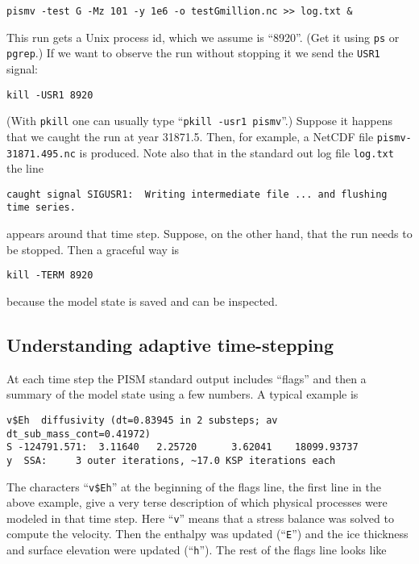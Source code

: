 \begin{verbatim}
pismv -test G -Mz 101 -y 1e6 -o testGmillion.nc >> log.txt &
\end{verbatim}

\noindent This run gets a Unix process id, which we assume is ``8920''.  (Get it using \texttt{ps} or \texttt{pgrep}.)  If we want to observe the run without stopping it we send the \texttt{USR1} signal:

\begin{verbatim}
kill -USR1 8920
\end{verbatim}

\noindent (With \texttt{pkill} one can usually type ``\texttt{pkill -usr1 pismv}''.)  Suppose it happens that we caught the run at year 31871.5.  Then, for example, a NetCDF file \texttt{pismv-31871.495.nc} is produced.  Note also that in the standard out log file \texttt{log.txt} the line

\begin{verbatim}
caught signal SIGUSR1:  Writing intermediate file ... and flushing time series.
\end{verbatim}
\noindent appears around that time step.  Suppose, on the other hand, that the run needs to be stopped.  Then a graceful way is

\begin{verbatim}
kill -TERM 8920
\end{verbatim}

\noindent because the model state is saved and can be inspected.



\subsection{Understanding adaptive time-stepping} \label{subsect:adapt}

At each time step the PISM standard output includes ``flags'' and then a summary of the model state using a few numbers.  A typical example is
\small
\begin{verbatim}
v$Eh  diffusivity (dt=0.83945 in 2 substeps; av dt_sub_mass_cont=0.41972)
S -124791.571:  3.11640   2.25720      3.62041    18099.93737
y  SSA:     3 outer iterations, ~17.0 KSP iterations each
\end{verbatim}
\normalsize

The characters ``\texttt{v\$Eh}'' at the beginning of the flags line, the first line in the above example, give a very terse description of which physical processes were modeled in that time step.  Here ``\texttt{v}'' means that a stress balance was solved to compute the velocity.  Then the enthalpy was updated (``\texttt{E}'') and the ice thickness and surface elevation were updated (``\texttt{h}'').  The rest of the flags line looks like

